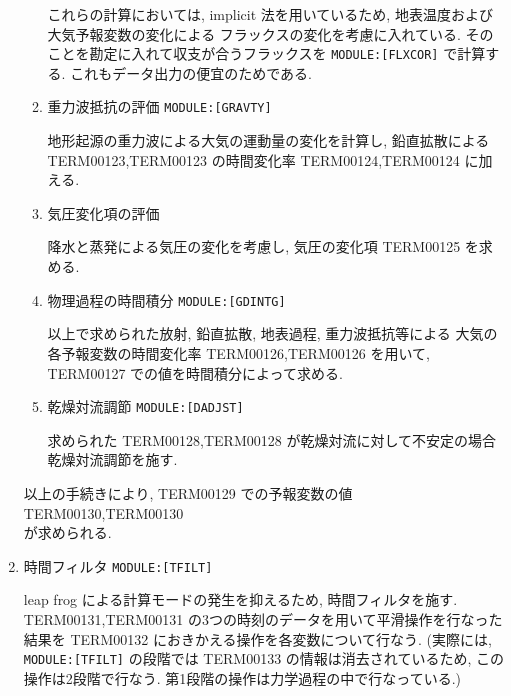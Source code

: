 \begin{enumerate}
\begin{enumerate}
これらの計算においては, implicit 法を用いているため,
地表温度および大気予報変数の変化による
フラックスの変化を考慮に入れている.
そのことを勘定に入れて収支が合うフラックスを
 \texttt{MODULE:[FLXCOR]} で計算する.
これもデータ出力の便宜のためである.

\item 重力波抵抗の評価 \texttt{MODULE:[GRAVTY]}

地形起源の重力波による大気の運動量の変化を計算し,
鉛直拡散による TERM00123,TERM00123 の時間変化率
TERM00124,TERM00124 に加える.

\item 気圧変化項の評価 

降水と蒸発による気圧の変化を考慮し,
気圧の変化項 TERM00125 を求める.

\item 物理過程の時間積分 \texttt{MODULE:[GDINTG]}

以上で求められた放射, 鉛直拡散, 地表過程, 重力波抵抗等による
大気の各予報変数の時間変化率
TERM00126,TERM00126 を用いて,
TERM00127 での値を時間積分によって求める.

\item 乾燥対流調節 \texttt{MODULE:[DADJST]}

求められた TERM00128,TERM00128 が乾燥対流に対して不安定の場合
乾燥対流調節を施す.

\end{enumerate}

以上の手続きにより,
TERM00129 での予報変数の値 \\
TERM00130,TERM00130  \\
が求められる.

\item 時間フィルタ \texttt{MODULE:[TFILT]}

leap frog による計算モードの発生を抑えるため,
時間フィルタを施す.
TERM00131,TERM00131 
の3つの時刻のデータを用いて平滑操作を行なった結果を
TERM00132 におきかえる操作を各変数について行なう.
(実際には, \texttt{MODULE:[TFILT]} の段階では
TERM00133 の情報は消去されているため,
この操作は2段階で行なう.
第1段階の操作は力学過程の中で行なっている.)

\end{enumerate}
